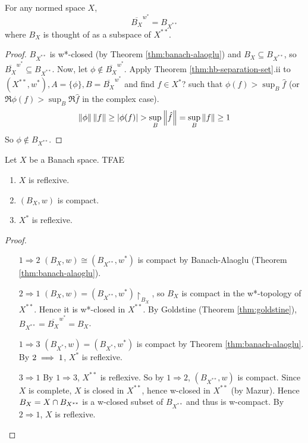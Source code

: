 \documentclass{article}
\begin{document}
\begin{thm}[Goldstine]\label{thm:goldstine}
  For any normed space $X$,
  $$\overline{B_X}^{w^*} = B_{X^{**}}$$
  where $B_X$ is thought of as a subspace of $X^{**}$.
\end{thm}
\begin{proof}
  $B_{X^{**}}$ is w*-closed (by Theorem \ref{thm:banach-alaoglu}) and $B_X \subseteq B_{X^{**}}$, so $\overline{B_X}^{w^*} \subseteq B_{X^{**}}$. Now, let $\phi \nin \overline{B_X}^{w^*}$. Apply Theorem \ref{thm:hb-separation-set}.ii to $(X^{**}, w^*), A = \{\phi\}, B = \overline{B_X}^{w^*}$ and find $f \in X^*$? such that $\phi(f) > \sup_B \hat f$ (or $\Re \phi(f) > \sup_B \Re \hat f$ in the complex case).
  $$\left\lVert \phi\right\rVert\left\lVert f\right\rVert \ge \left\lvert \phi(f)\right\rvert > \sup_B \left\lVert \hat f\right\rVert = \sup_B \left\lVert f\right\rVert \ge 1$$
  So $\phi \nin B_{X^{**}}$.
\end{proof}

\newlec

\begin{thm}
  Let $X$ be a Banach space. TFAE
  \begin{enumerate}
    \item $X$ is reflexive.
    \item $(B_X, w)$ is compact.
    \item $X^*$ is reflexive.
  \end{enumerate}
\end{thm}
\begin{proof}~
  \begin{itemize}
    \item[$1 \Rightarrow 2$] $(B_X, w) \cong (B_{X^{**}}, w^*)$ is compact by Banach-Alaoglu (Theorem \ref{thm:banach-alaoglu}).
    \item[$2 \Rightarrow 1$] $(B_X, w) = (B_{X^{**}}, w^*)\restriction_{B_X}$, so $B_X$ is compact in the w*-topology of $X^{**}$. Hence it is w*-closed in $X^{**}$. By Goldstine (Theorem \ref{thm:goldstine}), $B_{X^{**}} = \overline{B_X}^{w^*} = B_X$.
    \item[$1 \Rightarrow 3$] $(B_{X^*}, w) = (B_{X^*}, w^*)$ is compact by Theorem \ref{thm:banach-alaoglu}. By $2 \implies 1$, $X^*$ is reflexive.
    \item[$3 \Rightarrow 1$] By $1 \Rightarrow 3$, $X^{**}$ is reflexive. So by $1 \Rightarrow 2$, $(B_{X^{**}}, w)$ is compact. Since $X$ is complete, $X$ is closed in $X^{**}$, hence w-closed in $X^{**}$ (by Mazur). Hence $B_X = X \cap B_{X^{**}}$ is a w-closed subset of $B_{X^{**}}$ and thus is w-compact. By $2 \Rightarrow 1$, $X$ is reflexive.
  \end{itemize}
\end{proof}
\end{document}
